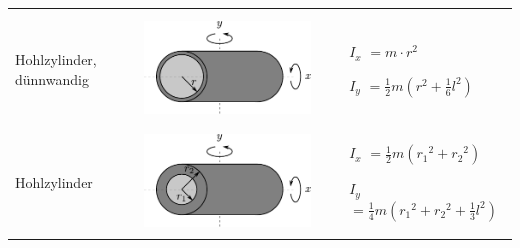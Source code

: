 \begin{table}[h!]
\begin{tabular}{m{2cm} c m{}}
\begin{itemize}
                \end{itemize} \\
& & \\
Hohlzylinder, dünnwandig &
        \begin{minipage}{0.3\textwidth}
        \centering
        \includegraphics[scale=\traegscale]{traeg/traeg-hohlzylinder-duenn.pdf}
        \end{minipage} &
                \begin{itemize}
                \item[$I_x$]$= m \cdot  r^2$
                \item[$I_y$]$= \frac12 m (r^2 + \frac16 l^2)$
                \end{itemize} \\
& & \\
Hohlzylinder &
        \begin{minipage}{0.3\textwidth}
        \centering
        \includegraphics[scale=\traegscale]{traeg/traeg-hohlzylinder.pdf}
        \end{minipage} &
                \begin{itemize}
                \item[$I_x$]$= \frac12 m \left({r_1}^2 + {r_2}^2 \right)$
                \item[$I_y$]$= \frac14 m \left({r_1}^2 + {r_2}^2
                        + \frac13 l^2 \right)$
                \end{itemize}\\

\end{tabular}
\end{table}
